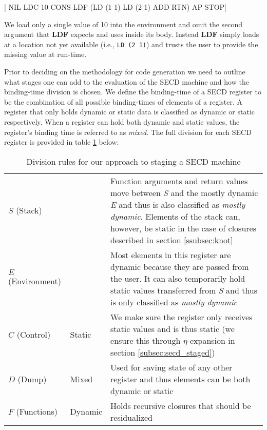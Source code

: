 \documentclass[a4paper,12pt,twoside,openright]{report}
\theoremstyle{definition}
\begin{document}
|   NIL LDC 10 CONS LDF (LD (1 1) LD (2 1) ADD RTN) AP STOP|

We load only a single value of 10 into the environment and omit the second argument that \textbf{LDF} expects and uses inside its body. Instead \textbf{LDF} simply loads at a location not yet available (i.e., \mbox{\texttt{LD (2 1)}}) and trusts the user to provide the missing value at run-time.

Prior to deciding on the methodology for code generation we need to outline what stages one can add to the evaluation of the SECD machine and how the binding-time division is chosen. We define the binding-time of a SECD register to be the combination of all possible binding-times of elements of a register. A register that only holds dynamic or static data is classified as dynamic or static respectively. When a register can hold both dynamic and static values, the register's binding time is referred to as \textit{mixed}. The full division for each SECD register is provided in table \ref{tbl:secd_division} below:

\begin{table}[!htbp]
  \centering
  \begin{tabular}{|p{3cm}|p{3cm}|p{6cm}|}
 	\hline
 	\thead{SECD Register}	&	\thead{Classification}	&	\thead{Reason}	\\ \hline
	$S$ (Stack)				&	\vtop{\hbox{\strut Mixed}\hbox{\strut (mostly dynamic)}}				&	Function arguments and return values move between \textit{S} and the mostly dynamic \textit{E} and thus is also classified as \textit{mostly dynamic}. Elements of the stack can, however, be static in the case of closures described in section \ref{ssubsec:knot} \\ \hline

	$E$ (Environment)		&	\vtop{\hbox{\strut Mixed}\hbox{\strut (mostly dynamic)}}	&	 Most elements in this register are dynamic because they are passed from the user. It can also temporarily hold static values transferred from \textit{S} and thus is only classified as \textit{mostly dynamic} \\ \hline

	$C$ (Control)				&	Static				& We make sure the register only receives static values and is thus static (we ensure this through $\eta$-expansion in section \ref{subsec:secd_staged})  \\ \hline

	$D$ (Dump)				&	Mixed				&	Used for saving state of any other register and thus elements can be both dynamic or static \\ \hline

	$F$ (Functions)		&	Dynamic				&	Holds recursive closures that should be residualized \\

	\hline
  \end{tabular}
  \caption{Division rules for our approach to staging a SECD machine}
  \label{tbl:secd_division}
\end{table}
\newpage
\end{document}
